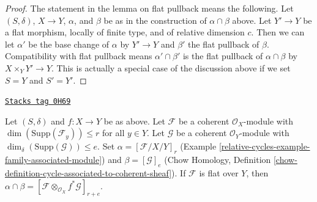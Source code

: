 \begin{proof}
\medskip\noindent
The statement in the lemma on flat pullback means the following.
Let $(S, \delta)$, $X \to Y$, $\alpha$, and $\beta$ be as in the
construction of $\alpha \cap \beta$ above. Let $Y' \to Y$ be a flat
morphism, locally of finite type, and of relative dimension $c$. Then
we can let $\alpha'$ be the base change of $\alpha$ by $Y' \to Y$
and $\beta'$ the flat pullback of $\beta$. Compatibility with flat
pullback means $\alpha' \cap \beta'$ is the flat pullback of
$\alpha \cap \beta$ by $X \times_Y Y' \to Y$. This is actually
a special case of the discussion above if we set $S = Y$ and $S' = Y'$.
\end{proof}

\begin{lemma}
\label{relative-cycles-lemma-action-coherent}
\href{https://stacks.math.columbia.edu/tag/0H69}{\texttt{Stacks tag 0H69}}

Let $(S, \delta)$ and $f : X \to Y$ be as above.
Let $\mathcal{F}$ be a coherent $\mathcal{O}_X$-module
with $\dim(\text{Supp}(\mathcal{F}_y)) \leq r$ for all $y \in Y$.
Let $\mathcal{G}$ be a coherent $\mathcal{O}_Y$-module
with $\dim_\delta(\text{Supp}(\mathcal{G})) \leq e$.
Set $\alpha = [\mathcal{F}/X/Y]_r$
(Example \ref{relative-cycles-example-family-associated-module}) and
$\beta = [\mathcal{G}]_e$ (Chow Homology, Definition
\ref{chow-definition-cycle-associated-to-coherent-sheaf}).
If $\mathcal{F}$ is flat over $Y$, then $\alpha \cap \beta =
[\mathcal{F} \otimes_{\mathcal{O}_X} f^*\mathcal{G}]_{r + e}$.
\end{lemma}

